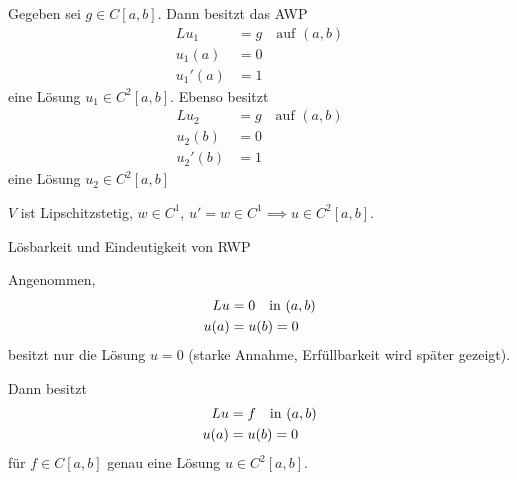 \begin{folgerung}\label{fol:2-2}
  Gegeben sei $g \in C[a, b]$. Dann besitzt das AWP
  \begin{align*}
    L u_{1} &= g \quad \text{auf } (a, b)\\
    u_{1}(a) &=0\\
    u_{1}'(a) &=1
  \end{align*}
eine Lösung $u_{1} \in C^{2}[a, b]$. Ebenso besitzt 
  \begin{align*}
    L u_{2} &= g \quad \text{auf } (a, b)\\
    u_{2}(b) &=0\\
    u_{2}'(b) &=1
  \end{align*}
eine Lösung $u_{2} \in C^{2}[a, b]$
\end{folgerung}
\begin{beweis}
  $V$ ist Lipschitzstetig, $w \in C^{1}$, $u' = w \in C^{1} \implies u \in C^{2}[a, b]$. 
\end{beweis}
\begin{satz}\label{thm:2-3}Lösbarkeit und Eindeutigkeit von RWP

Angenommen,
\begin{align}\label{eq:2-3}
    L u &= 0 \quad \text{in } (a, b)\\
    u(a) &= u(b) =0 \notag
\end{align}
besitzt nur die Lösung $u = 0$ (starke Annahme, Erfüllbarkeit wird später gezeigt).   

Dann besitzt
\begin{align}\label{eq:2-4}
  L u &= f \quad \text{in } (a, b)\\
  u(a) &= u(b) =0 \notag
\end{align}
für $f \in C[a, b]$ genau eine Lösung $u \in C^{2}[a, b]$. 
\end{satz}
